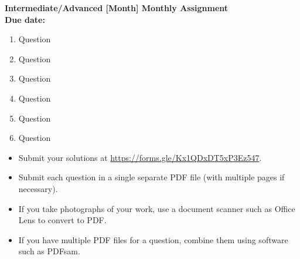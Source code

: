 \documentclass{article}
\begin{document}
\thispagestyle{empty}

\begin{center}
  \textbf{\Large Intermediate/Advanced [Month] Monthly Assignment}
  \\ \vspace{1em}
  \textbf{\large Due date:}
\end{center}

\vspace{12pt}

\begin{enumerate}[1.]

\vspace{6pt}
\item %
Question

\item %
Question

\item %
Question

\item %
Question

\item %
Question

\item %
Question

\end{enumerate}


\vfill
\begin{itemize}
	\item Submit your solutions at \url{https://forms.gle/Kx1QDxDT5xP3Ez547}.
	\item Submit each question in a single separate PDF file (with multiple pages if necessary).
	\item If you take photographs of your work, use a document scanner such as Office Lens to convert to PDF.
	\item If you have multiple PDF files for a question, combine them using software such as PDFsam.
\end{itemize}
\end{document}
